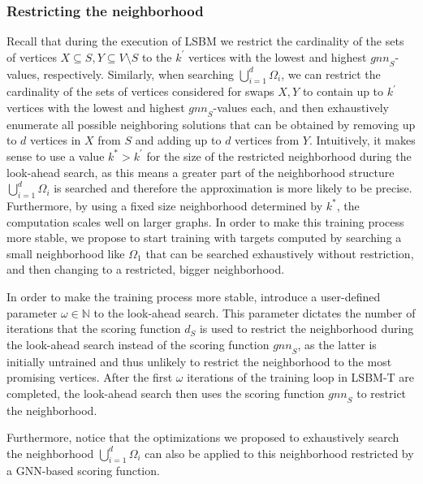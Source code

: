 \documentclass[draft,final]{vutinfth} %
\begin{document}
\subsubsection{Restricting the neighborhood}

Recall that during the execution of LSBM we restrict the cardinality of the sets of vertices $X \subseteq S, Y \subseteq V \setminus S$ to the $k^\prime$ vertices with the lowest and highest $\mathit{gnn}_S$-values, respectively. Similarly, when searching $\bigcup_{i=1}^d \Omega_i$, we can restrict the cardinality of the sets of vertices considered for swaps $X, Y$ to contain up to $k^\prime$ vertices with the lowest and highest $\mathit{gnn}_S$-values each, and then exhaustively enumerate all possible neighboring solutions that can be obtained by removing up to $d$ vertices in $X$ from $S$ and adding up to $d$ vertices from $Y$. Intuitively, it makes sense to use a value $k^* > k^\prime$ for the size of the restricted neighborhood during the look-ahead search, as this means a greater part of the neighborhood structure $\bigcup_{i=1}^d \Omega_i$ is searched and therefore the approximation is more likely to be precise. 
Furthermore, by using a fixed size neighborhood determined by $k^*$, the computation scales well on larger graphs. 
In order to make this training process more stable, we propose to start training with targets computed by searching a small neighborhood like $\Omega_1$ that can be searched exhaustively without restriction, and then changing to a restricted, bigger neighborhood. 

In order to make the training process more stable, introduce a user-defined parameter $\omega \in \mathbb{N}$ to the look-ahead search. This parameter dictates the number of iterations that the scoring function $d_S$ is used to restrict the neighborhood during the look-ahead search instead of the scoring function $\mathit{gnn}_S$, as the latter is initially untrained and thus unlikely to restrict the neighborhood to the most promising vertices. After the first $\omega$ iterations of the training loop in LSBM-T are completed, the look-ahead search then uses the scoring function $\mathit{gnn}_S$ to restrict the neighborhood. 

Furthermore, notice that the optimizations we proposed to exhaustively search the neighborhood $\bigcup_{i=1}^d \Omega_i$ can also be applied to this neighborhood restricted by a GNN-based scoring function. 

\end{document}
